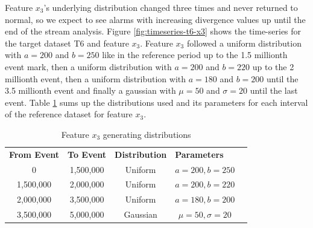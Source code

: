 \documentclass[sigconf]{acmart}
\begin{document}
Feature $x_3$'s underlying distribution changed three times and never returned to normal, so we expect to see alarms with increasing divergence values up until the end of the stream analysis. Figure \ref{fig:timeseries-t6-x3} shows the time-series for the target dataset T6 and feature $x_3$. Feature $x_3$ followed a uniform distribution with $a=200$ and $b=250$ like in the reference period up to the 1.5 millionth event mark, then a uniform distribution with $a=200$ and $b=220$ up to the 2 millionth event, then a uniform distribution with $a=180$ and $b=200$ until the 3.5 millionth event and finally a gaussian with $\mu=50$ and $\sigma=20$ until the last event. Table \ref{tbl:multi-feat-x3-changes} sums up the distributions used and its parameters for each interval of the reference dataset for feature $x_3$.
\begin{table}[!htb]
    \begin{center}
    \begin{tabular}{|c|c|c|c|l}
    \cline{1-4}
    \textbf{From Event} & \textbf{To Event} & \textbf{Distribution} & \multicolumn{1}{l|}{\textbf{Parameters}} &  \\ \cline{1-4}
    0                   & 1,500,000         & Uniform               & $a=200, b=250$                           &  \\ \cline{1-4}
    1,500,000           & 2,000,000         & Uniform               & $a=200, b=220$                           &  \\ \cline{1-4}
    2,000,000            & 3,500,000         & Uniform               & $a=180, b=200$                           &  \\ \cline{1-4}
    3,500,000           & 5,000,000         & Gaussian              & $\mu=50, \sigma=20$                      &  \\ \cline{1-4}
    \end{tabular}
    \end{center}
    \caption{Feature $x_3$ generating distributions}
    \label{tbl:multi-feat-x3-changes}
\end{table}
\end{document}
